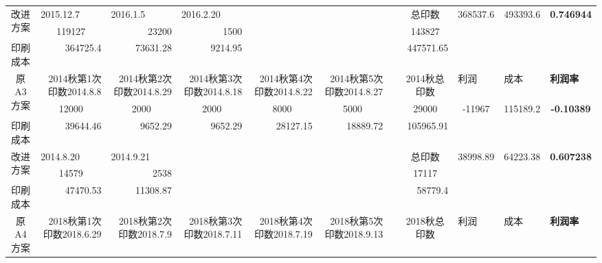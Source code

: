 \documentclass[bwprint]{gmcmthesis}
\begin{document}
\begin{table}[htbp]
{\begin{tabular}{crrrrrrrccc}
    \multirow{2}[0]{*}{改进方案} & \multicolumn{1}{l}{2015.12.7} & \multicolumn{1}{l}{2016.1.5} & \multicolumn{1}{l}{2016.2.20} &       &       &       & \multicolumn{1}{c}{总印数} & \multirow{3}[0]{*}{368537.6} & \multirow{3}[0]{*}{493393.6} & \multirow{2}[0]{*}{\textbf{0.746944}} \\
          & \multicolumn{1}{c}{119127} & 23200 & 1500  &       &       &       & \multicolumn{1}{c}{143827} &       &       &  \\
    印刷成本  & 364725.4 & 73631.28 & 9214.95 &       &       &       & 447571.65 &       &       &  \\
\midrule
    \multirow{2}[0]{*}{原A3方案} & \multicolumn{1}{p{4.04em}}{2014秋第1次印数2014.8.8} & \multicolumn{1}{p{4.04em}}{2014秋第2次印数2014.8.29} & \multicolumn{1}{p{4.04em}}{2014秋第3次印数2014.8.18} & \multicolumn{1}{p{4.04em}}{2014秋第4次印数2014.8.22} & \multicolumn{1}{p{4.04em}}{2014秋第5次印数2014.8.27} &       & \multicolumn{1}{c}{2014秋总印数} & \multicolumn{1}{l}{利润} & \multicolumn{1}{l}{成本} & \multicolumn{1}{l}{\textbf{利润率}} \\
          & \multicolumn{1}{c}{12000} & \multicolumn{1}{c}{2000} & \multicolumn{1}{c}{2000} & \multicolumn{1}{c}{8000} & \multicolumn{1}{c}{5000} &       & \multicolumn{1}{c}{29000} & \multirow{2}[0]{*}{-11967} & \multirow{2}[0]{*}{115189.2} & \multirow{2}[0]{*}{\textbf{-0.10389}} \\
    印刷成本  & 39644.46 & 9652.29 & 9652.29 & 28127.15 & 18889.72 &       & 105965.91 &       &       &  \\
    \multirow{2}[0]{*}{改进方案} & \multicolumn{1}{l}{2014.8.20} & \multicolumn{1}{l}{2014.9.21} &       &       &       &       & \multicolumn{1}{c}{总印数} & \multirow{3}[0]{*}{38998.89} & \multirow{3}[0]{*}{64223.38} & \multirow{2}[0]{*}{\textbf{0.607238}} \\
          & \multicolumn{1}{c}{14579} & 2538  &       &       &       &       & \multicolumn{1}{c}{17117} &       &       &  \\
    印刷成本  & 47470.53 & 11308.87 &       &       &       &       & 58779.4 &       &       &  \\
    \midrule
    \multirow{2}[0]{*}{原A4方案} & \multicolumn{1}{p{4.04em}}{2018秋第1次印数2018.6.29} & \multicolumn{1}{p{4.04em}}{2018秋第2次印数2018.7.9} & \multicolumn{1}{p{4.04em}}{2018秋第3次印数2018.7.11} & \multicolumn{1}{p{4.04em}}{2018秋第4次印数2018.7.19} & \multicolumn{1}{p{4.04em}}{2018秋第5次印数2018.9.13} &       & \multicolumn{1}{c}{2018秋总印数} & \multicolumn{1}{l}{利润} & \multicolumn{1}{l}{成本} & \multicolumn{1}{l}{\textbf{利润率}} \\

\end{tabular}}
\end{table}
\end{document}
